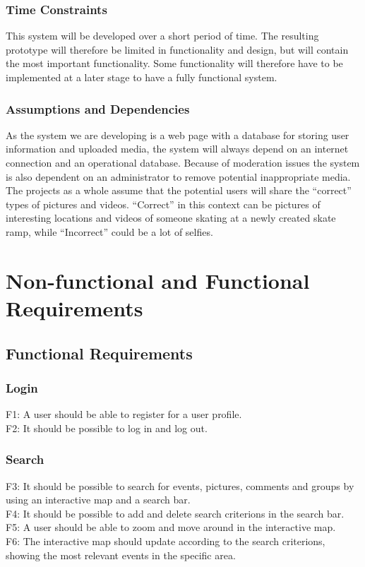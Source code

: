 \subsubsection*{Time Constraints} 
This system will be developed over a short period of time. The resulting prototype will therefore be limited in functionality and design, but will contain the most important functionality. Some functionality will therefore have to be implemented at a later stage to have a fully functional system.
\subsubsection*{Assumptions and Dependencies} As the system we are developing is a web page with a database for storing user information and uploaded media, the system will always depend on an internet connection and an operational database. Because of moderation issues the system is also dependent on an administrator to remove potential inappropriate  media. The projects as a whole assume that the potential users will share the “correct” types of pictures and videos. “Correct” in this context can be pictures of interesting locations and videos of someone skating at a newly created skate ramp, while  “Incorrect” could be a lot of selfies.

\section{Non-functional and Functional Requirements}
\label{sec:SysReqReqs}

\subsection{Functional Requirements}
\label{subsec:SysReqReqsFunc}

\subsubsection{Login}
F1: A user should be able to register for a user profile. \\
F2: It should be possible to log in and log out.

\subsubsection{Search}
F3: It should be possible to search for events, pictures, comments and groups by using an interactive map and a search bar. \\
F4: It should be possible to add and delete search criterions in the search bar. \\
F5: A user should be able to zoom and move around in the interactive map. \\
F6: The interactive map should update according to the search criterions, showing the most relevant events in the specific area.

